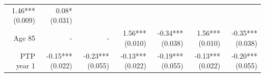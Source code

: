 \documentclass[]{article}
\begin{document}
\begin{longtable}[c]{@{}rrrrrrr@{}}
\begin{minipage}[t]{0.11\columnwidth}
1.46*** (0.009)
\strut\end{minipage} &
\begin{minipage}[t]{0.11\columnwidth}\raggedleft\strut
0.08* (0.031)
\strut\end{minipage}\tabularnewline
\begin{minipage}[t]{0.12\columnwidth}\raggedleft\strut
Age 85
\strut\end{minipage} &
\begin{minipage}[t]{0.11\columnwidth}\raggedleft\strut
-
\strut\end{minipage} &
\begin{minipage}[t]{0.12\columnwidth}\raggedleft\strut
-
\strut\end{minipage} &
\begin{minipage}[t]{0.11\columnwidth}\raggedleft\strut
1.56*** (0.010)
\strut\end{minipage} &
\begin{minipage}[t]{0.12\columnwidth}\raggedleft\strut
-0.34*** (0.038)
\strut\end{minipage} &
\begin{minipage}[t]{0.11\columnwidth}\raggedleft\strut
1.56*** (0.010)
\strut\end{minipage} &
\begin{minipage}[t]{0.11\columnwidth}\raggedleft\strut
-0.35*** (0.038)
\strut\end{minipage}\tabularnewline
\begin{minipage}[t]{0.12\columnwidth}\raggedleft\strut
PTP year 1
\strut\end{minipage} &
\begin{minipage}[t]{0.11\columnwidth}\raggedleft\strut
-0.15*** (0.022)
\strut\end{minipage} &
\begin{minipage}[t]{0.12\columnwidth}\raggedleft\strut
-0.23*** (0.055)
\strut\end{minipage} &
\begin{minipage}[t]{0.11\columnwidth}\raggedleft\strut
-0.13*** (0.022)
\strut\end{minipage} &
\begin{minipage}[t]{0.12\columnwidth}\raggedleft\strut
-0.19*** (0.055)
\strut\end{minipage} &
\begin{minipage}[t]{0.11\columnwidth}\raggedleft\strut
-0.13*** (0.022)
\strut\end{minipage} &
\begin{minipage}[t]{0.11\columnwidth}\raggedleft\strut
-0.20*** (0.055)

\end{minipage}
\end{longtable}
\end{document}
